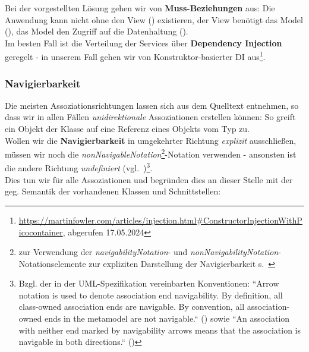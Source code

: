 \noindent
Bei der vorgestellten Lösung gehen wir von \textbf{Muss-Beziehungen} aus: Die Anwendung kann nicht ohne den View () existieren, der View benötigt das Model (), das Model den Zugriff auf die Datenhaltung ().\\
Im besten Fall ist die Verteilung der Services über \textbf{Dependency Injection} geregelt - in unserem Fall gehen wir von Konstruktor-basierter DI aus\footnote{
\url{https://martinfowler.com/articles/injection.html#ConstructorInjectionWithPicocontainer}, abgerufen 17.05.2024
}.

\subsubsection*{Navigierbarkeit}
Die meisten Assoziationsrichtungen lassen sich aus dem Quelltext entnehmen, so dass wir in allen Fällen \textit{unidirektionale} Assoziationen erstellen können: So greift ein  Objekt der Klasse  auf eine Referenz eines Objekts vom Typ  zu.\\
Wollen wir die \textbf{Navigierbarkeit} in umgekehrter Richtung \textit{explizit} ausschließen, müssen wir noch die \textit{nonNavigableNotation}\footnote{
    zur Verwendung der \textit{navigabilityNotation}- und \textit{nonNavigabilityNotation}-Notationselemente zur expliziten Darstellung der Navigierbarkeit s.~\cite[203]{OMG17}
}-Notation verwenden - ansonsten ist die andere Richtung \textit{undefiniert} (vgl.~\cite[285]{Bal05})\footnote{
    Bzgl. der in der UML-Spezifikation vereinbarten Konventionen: ``Arrow notation is used to denote association end navigability. By definition, all class-owned association ends are navigable. By convention, all association-owned ends in the metamodel are not navigable.`` (\cite[18]{OMG17}) sowie ``An association with neither end marked by navigability arrows means that the association is navigable in both directions.`` (\cite[19]{OMG17})
}.\\
Dies tun wir für alle Assoziationen und begründen dies an dieser Stelle mit der geg. Semantik der vorhandenen Klassen und Schnittstellen:


